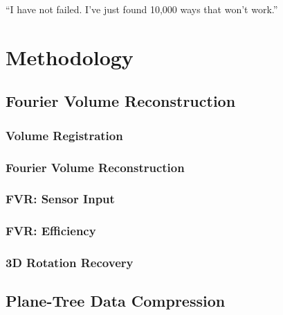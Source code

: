 \begin{savequote}[8cm]
  ``I have not failed. I've just found 10,000 ways that won't work.''
\end{savequote}
\makeatletter
\chapter{Methodology}
\label{ch:Metho}


\section{Fourier Volume Reconstruction}
\label{FVRSectionA}


\subsection{Volume Registration} \label{Sec:VolumeRegistrationSection}


\subsection{Fourier Volume Reconstruction} \label{Sec:AFVRApproach}


\subsection{FVR: Sensor Input} 
\label{Sec:AMonoFVRApproach}


\subsection{FVR: Efficiency} \label{Sec:Efficiency}


\subsection{3D Rotation Recovery}
\label{FullRecovery3DSection}




\section{Plane-Tree Data Compression}

